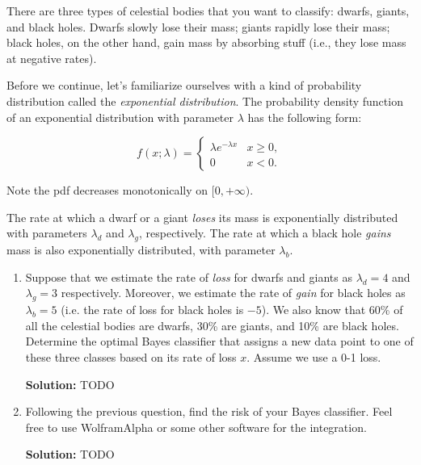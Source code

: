 \documentclass{article}
\newenvironment{solution}{\color{blue} \smallskip \textbf{Solution:}}{}
\begin{document}
There are three types of celestial bodies that you want to classify: dwarfs, giants, and black holes. Dwarfs slowly lose their mass; giants rapidly lose their mass; black holes, on the other hand, gain mass by absorbing stuff (i.e., they lose mass at negative rates). 

Before we continue, let's familiarize ourselves with a kind of probability distribution called the \textit{exponential distribution}. The probability density function of an exponential distribution with parameter $\lambda$ has the following form:

\[
f(x; \lambda) =
  \begin{cases}
  \lambda e^{-\lambda x} & x \ge 0, \\
  0                      & x < 0.
\end{cases}
\]

Note the pdf decreases monotonically on $[0, +\infty)$.

The rate at which a dwarf or a giant \textit{loses} its mass is exponentially distributed with parameters $\lambda_d$ and $\lambda_g$, respectively. The rate at which a black hole \textit{gains} mass is also exponentially distributed, with parameter $\lambda_b$.

\begin{enumerate}
\item Suppose that we estimate the rate of \textit{loss} for dwarfs and giants as $\lambda_{d} = 4$ and $\lambda_{g} = 3$ respectively. Moreover, we estimate the rate of \textit{gain} for black holes as $\lambda_{b} = 5$ (i.e. the rate of loss for black holes is $-5$). We also know that 60\% of all the celestial bodies are dwarfs, 30\% are giants, and 10\% are black holes. Determine the optimal Bayes classifier that assigns a new data point to one of these three classes based on its rate of loss $x$. Assume we use a 0-1 loss.

\begin{solution}
    TODO
\end{solution}

\newpage
\item Following the previous question, find the risk of your Bayes classifier. Feel free to use WolframAlpha or some other software for the integration.

\begin{solution}
    TODO
\end{solution}

\end{enumerate}
\end{document}
